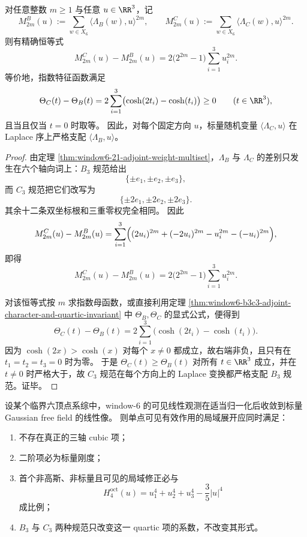 \begin{theorem}\label{thm:window6-b3c3-even-moment-gap-laplace-domination}
对任意整数 \(m\ge 1\) 与任意 \(u\in \RR^3\)，记
\[
M_{2m}^{B}(u):=\sum_{w\in X_6}\langle \Lambda_B(w),u\rangle^{2m},
\qquad
M_{2m}^{C}(u):=\sum_{w\in X_6}\langle \Lambda_C(w),u\rangle^{2m}.
\]
则有精确恒等式
\[
M_{2m}^{C}(u)-M_{2m}^{B}(u)
=
2\bigl(2^{2m}-1\bigr)\sum_{i=1}^{3}u_i^{2m}.
\]
等价地，指数特征函数满足
\[
\Theta_C(t)-\Theta_B(t)
=
2\sum_{i=1}^{3}\bigl(\cosh(2t_i)-\cosh(t_i)\bigr)\ge 0
\qquad
(t\in \RR^3),
\]
且当且仅当 \(t=0\) 时取等。
因此，对每个固定方向 \(u\)，标量随机变量 \(\langle \Lambda_C,u\rangle\) 在 Laplace 序上严格支配 \(\langle \Lambda_B,u\rangle\)。
\end{theorem}
\begin{proof}
由定理 \ref{thm:window6-21-adjoint-weight-multiset}，\(\Lambda_B\) 与 \(\Lambda_C\) 的差别只发生在六个轴向词上：\(B_3\) 规范给出
\[
\{\pm e_1,\pm e_2,\pm e_3\},
\]
而 \(C_3\) 规范把它们改写为
\[
\{\pm 2e_1,\pm 2e_2,\pm 2e_3\}.
\]
其余十二条双坐标根和三重零权完全相同。
因此
\[
M_{2m}^{C}(u)-M_{2m}^{B}(u)
=
\sum_{i=1}^{3}\Bigl((2u_i)^{2m}+(-2u_i)^{2m}-u_i^{2m}-(-u_i)^{2m}\Bigr),
\]
即得
\[
M_{2m}^{C}(u)-M_{2m}^{B}(u)
=
2\bigl(2^{2m}-1\bigr)\sum_{i=1}^{3}u_i^{2m}.
\]

对该恒等式按 \(m\) 求指数母函数，或直接利用定理 \ref{thm:window6-b3c3-adjoint-character-and-quartic-invariant} 中 \(\Theta_B,\Theta_C\) 的显式公式，便得到
\[
\Theta_C(t)-\Theta_B(t)
=
2\sum_{i=1}^{3}\bigl(\cosh(2t_i)-\cosh(t_i)\bigr).
\]
因为 \(\cosh(2x)>\cosh(x)\) 对每个 \(x\neq 0\) 都成立，故右端非负，且只有在 \(t_1=t_2=t_3=0\) 时为零。
于是 \(\Theta_C(t)\ge \Theta_B(t)\) 对所有 \(t\in \RR^3\) 成立，并在 \(t\neq 0\) 时严格大于，故 \(C_3\) 规范在每个方向上的 Laplace 变换都严格支配 \(B_3\) 规范。证毕。
\end{proof}

\begin{conjecture}\label{conj:window6-visible-gff-unique-quartic-residual}
设某个临界六顶点系综中，window-\(6\) 的可见线性观测在适当归一化后收敛到标量 Gaussian free field 的线性像。
则单点可见有效作用的局域展开应同时满足：
\begin{enumerate}
  \item 不存在真正的三轴 cubic 项；
  \item 二阶项必为标量刚度；
  \item 首个非高斯、非标量且可见的局域修正必与
  \[
  H_4^{\mathrm{oct}}(u)=u_1^4+u_2^4+u_3^4-\frac35|u|^4
  \]
  成比例；
  \item \(B_3\) 与 \(C_3\) 两种规范只改变这一 quartic 项的系数，不改变其形式。
\end{enumerate}
\end{conjecture}

